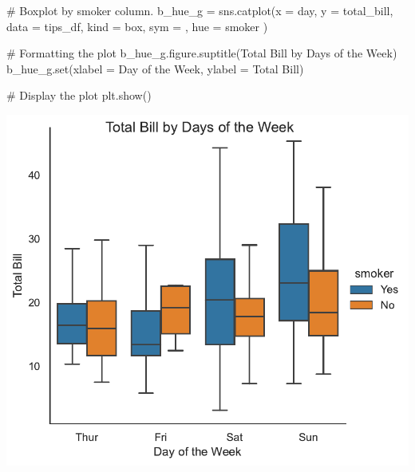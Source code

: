\documentclass[
  letterpaper,
  DIV=11,
  numbers=noendperiod]{scrartcl}
\newenvironment{Shaded}{\begin{snugshade}}{\end{snugshade}}
\newcommand{\BuiltInTok}[1]{\textcolor[rgb]{0.00,0.46,0.62}{#1}}
\newcommand{\CommentTok}[1]{\textcolor[rgb]{0.37,0.37,0.37}{#1}}
\newcommand{\NormalTok}[1]{\textcolor[rgb]{0.00,0.46,0.62}{#1}}
\newcommand{\OperatorTok}[1]{\textcolor[rgb]{0.37,0.37,0.37}{#1}}
\newcommand{\StringTok}[1]{\textcolor[rgb]{0.13,0.47,0.30}{#1}}
\begin{document}
\begin{Shaded}
\begin{Highlighting}[]
\CommentTok{\# Boxplot by smoker column.}
\NormalTok{b\_hue\_g }\OperatorTok{=}\NormalTok{ sns.catplot(x }\OperatorTok{=} \StringTok{\textquotesingle{}day\textquotesingle{}}\NormalTok{,}
\NormalTok{                      y }\OperatorTok{=} \StringTok{\textquotesingle{}total\_bill\textquotesingle{}}\NormalTok{,}
\NormalTok{                      data }\OperatorTok{=}\NormalTok{ tips\_df,}
\NormalTok{                      kind }\OperatorTok{=} \StringTok{\textquotesingle{}box\textquotesingle{}}\NormalTok{,}
\NormalTok{                      sym }\OperatorTok{=} \StringTok{\textquotesingle{}\textquotesingle{}}\NormalTok{,}
\NormalTok{                      hue }\OperatorTok{=} \StringTok{\textquotesingle{}smoker\textquotesingle{}}
\NormalTok{                  )}

\CommentTok{\# Formatting the plot}
\NormalTok{b\_hue\_g.figure.suptitle(}\StringTok{\textquotesingle{}Total Bill by Days of the Week\textquotesingle{}}\NormalTok{)}
\NormalTok{b\_hue\_g.}\BuiltInTok{set}\NormalTok{(xlabel }\OperatorTok{=} \StringTok{\textquotesingle{}Day of the Week\textquotesingle{}}\NormalTok{,}
\NormalTok{            ylabel }\OperatorTok{=} \StringTok{\textquotesingle{}Total Bill\textquotesingle{}}\NormalTok{)}
          
\CommentTok{\# Display the plot}
\NormalTok{plt.show()}
\end{Highlighting}
\end{Shaded}

\includegraphics{data_visualization_with_seaborn_files/figure-pdf/cell-18-output-1.pdf}
\end{document}
